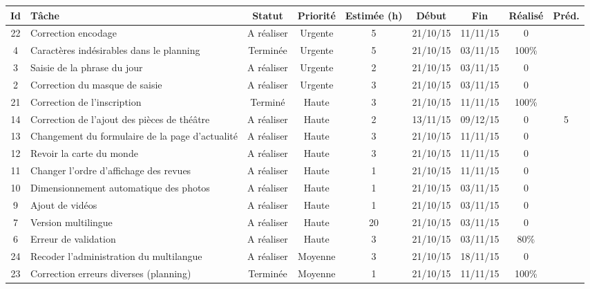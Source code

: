 \begin{tabular}{ | c | p{4cm} | c | c | c | c | c | c | c |  }
\hline 
Id & Tâche & Statut & Priorité & Estimée (h) & Début & Fin & Réalisé &
Préd. \\ \hline


22 & Correction encodage & A réaliser & Urgente & 5 & 21/10/15 & 11/11/15 & 0
	 & \\ \hline
4 & Caractères indésirables dans le planning & Terminée & Urgente & 5 & 21/10/15
	& 03/11/15 & 100\% & \\ \hline
3 & Saisie de la phrase du jour & A réaliser & Urgente & 2 & 21/10/15 & 03/11/15
	& 0 & \\ \hline
2 & Correction du masque de saisie & A réaliser & Urgente & 3 & 21/10/15 &
	03/11/15 & 0 & \\ \hline
	
21 & Correction de l'inscription & Terminé & Haute & 3 & 21/10/15 &
	11/11/15 & 100\% & \\ \hline
14 & Correction de l'ajout des pièces de théâtre & A réaliser & Haute & 2 &
	13/11/15 & 09/12/15 & 0 & 5 \\ \hline
13 & Changement du formulaire de la page d'actualité & A réaliser & Haute & 3 &
	21/10/15 & 11/11/15 & 0 & \\ \hline
12 & Revoir la carte du monde & A réaliser & Haute & 3 & 21/10/15 & 11/11/15 & 0
	& \\ \hline
11 & Changer l'ordre d'affichage des revues & A réaliser & Haute & 1 & 21/10/15
	& 11/11/15 & 0 & \\ \hline
10 & Dimensionnement automatique des photos & A réaliser & Haute & 1 & 21/10/15
	& 03/11/15 & 0 & \\ \hline
9 & Ajout de vidéos & A réaliser & Haute & 1 & 21/10/15 & 03/11/15 & 0 & \\
\hline
7 & Version multilingue & A réaliser & Haute & 20 & 21/10/15 & 03/11/15 & 0 & \\
\hline
6 & Erreur de validation & A réaliser & Haute & 3 & 21/10/15 & 03/11/15 & 80\% &
\\
\hline


24 & Recoder l'administration du multilangue & A réaliser & Moyenne & 3 &
	21/10/15 & 18/11/15 & 0 & \\ \hline
23 & Correction erreurs diverses (planning)
	& Terminée & Moyenne & 1 & 21/10/15 & 11/11/15 & 100\% & \\ \hline
	

\end{tabular}
